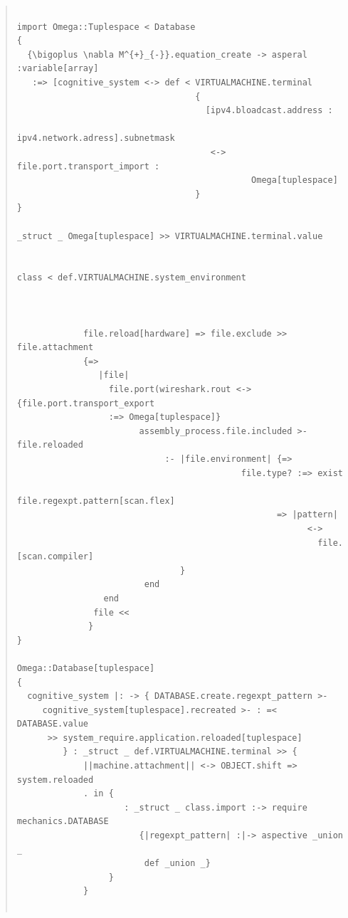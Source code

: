 \documentclass{jsarticle}
\begin{document}
{\begin{quote}
\begin{verbatim}
\end{verbatim}
\end{quote}



\begin{quote}
\setlength{\baselineskip}{12pt}
\begin{verbatim}

import Omega::Tuplespace < Database
{
  {\bigoplus \nabla M^{+}_{-}}.equation_create -> asperal :variable[array]
   :=> [cognitive_system <-> def < VIRTUALMACHINE.terminal
                                   {
                                     [ipv4.bloadcast.address : 
                                       ipv4.network.adress].subnetmask
                                      <-> file.port.transport_import :
                                              Omega[tuplespace]
                                   }
}

_struct _ Omega[tuplespace] >> VIRTUALMACHINE.terminal.value


class < def.VIRTUALMACHINE.system_environment



             file.reload[hardware] => file.exclude >> file.attachment
             {=>
                |file|
                  file.port(wireshark.rout <-> {file.port.transport_export 
                  :=> Omega[tuplespace]}
                        assembly_process.file.included >- file.reloaded
                             :- |file.environment| {=>
                                            file.type? :=> exist
                                              file.regexpt.pattern[scan.flex]
                                                   => |pattern|
                                                         <->
                                                           file.[scan.compiler]
                                }              
                         end
                 end
               file <<
              }
}

Omega::Database[tuplespace]
{
  cognitive_system |: -> { DATABASE.create.regexpt_pattern >-
     cognitive_system[tuplespace].recreated >- : =< DATABASE.value 
      >> system_require.application.reloaded[tuplespace]
         } : _struct _ def.VIRTUALMACHINE.terminal >> {
             ||machine.attachment|| <-> OBJECT.shift => system.reloaded                  
             . in {
                     : _struct _ class.import :-> require mechanics.DATABASE
                        {|regexpt_pattern| :|-> aspective _union _
                         def _union _} 
                  }
             }
     

\end{verbatim}
\end{quote}}
\end{document}
